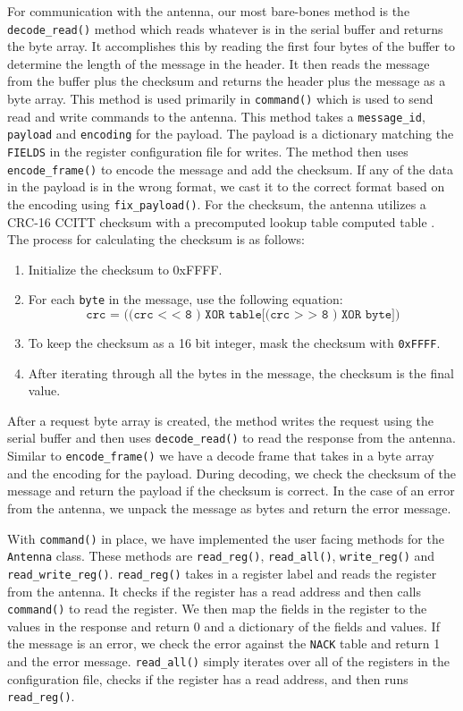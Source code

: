 For communication with the antenna, our most bare-bones method is the \texttt{decode\_read()} method which reads whatever is in the serial buffer and returns the byte array.
It accomplishes this by reading the first four bytes of the buffer to determine the length of the message in the header. 
It then reads the message from the buffer plus the checksum and returns the header plus the message as a byte array.
This method is used primarily in \texttt{command()} which is used to send read and write commands to the antenna.
This method takes a \texttt{message\_id}, \texttt{payload} and \texttt{encoding} for the payload.
The payload is a dictionary matching the \texttt{FIELDS} in the register configuration file for writes. 
The method then uses \texttt{encode\_frame()} to encode the message and add the checksum.
If any of the data in the payload is in the wrong format, we cast it to the correct format based on the encoding using \texttt{fix\_payload()}.
For the checksum, the antenna utilizes a CRC-16 CCITT checksum with a precomputed lookup table computed table \parencite{koopman2004cyclic}.
The process for calculating the checksum is as follows:
\begin{enumerate}
    \item Initialize the checksum to 0xFFFF.
    \item For each \texttt{byte} in the message, use the following equation:
    \begin{equation}
        \texttt{crc = ((crc < < 8 ) XOR table[(crc > > 8 ) XOR byte])}
    \end{equation}
    \item To keep the checksum as a 16 bit integer, mask the checksum with \texttt{0xFFFF}.
    \item After iterating through all the bytes in the message, the checksum is the final value.
\end{enumerate}
After a request byte array is created, the method writes the request using the serial buffer and then uses \texttt{decode\_read()} to read the response from the antenna.
Similar to \texttt{encode\_frame()} we have a decode frame that takes in a byte array and the encoding for the payload.
During decoding, we check the checksum of the message and return the payload if the checksum is correct.
In the case of an error from the antenna, we unpack the message as bytes and return the error message.

With \texttt{command()} in place, we have implemented the user facing methods for the \texttt{Antenna} class.
These methods are \texttt{read\_reg()}, \texttt{read\_all()}, \texttt{write\_reg()} and \texttt{read\_write\_reg()}.
\texttt{read\_reg()} takes in a register label and reads the register from the antenna.
It checks if the register has a read address and then calls \texttt{command()} to read the register.
We then map the fields in the register to the values in the response and return 0 and a dictionary of the fields and values.
If the message is an error, we check the error against the \texttt{NACK} table and return 1 and the error message.
\texttt{read\_all()} simply iterates over all of the registers in the configuration file, checks if the register has a read address, and then runs \texttt{read\_reg()}.

